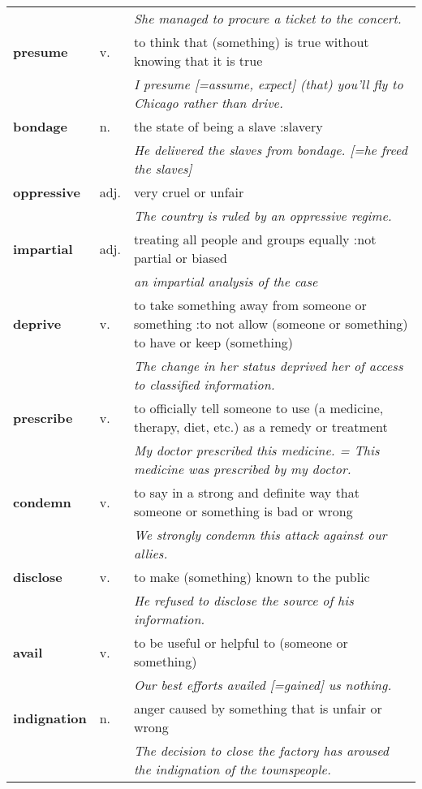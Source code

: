 \documentclass[a4paper]{article}
\begin{document}
\begin{longtable}{llp{11cm}}
 & & \textit{She managed to procure a ticket to the concert.}\\[0.08cm]
\textbf{presume} & v. &  to think that (something) is true without knowing that it is true \\
 & & \textit{I presume [=assume, expect] (that) you'll fly to Chicago rather than drive.}\\[0.08cm]
\textbf{bondage} & n. &  the state of being a slave :slavery \\
 & & \textit{He delivered the slaves from bondage. [=he freed the slaves]}\\[0.08cm]
\textbf{oppressive} & adj. &  very cruel or unfair \\
 & & \textit{The country is ruled by an oppressive regime.}\\[0.08cm]
\textbf{impartial} & adj. &  treating all people and groups equally :not partial or biased \\
 & & \textit{an impartial analysis of the case}\\[0.08cm]
\textbf{deprive} & v. &  to take something away from someone or something :to not allow (someone or something) to have or keep (something) \\
 & & \textit{The change in her status deprived her of access to classified information.}\\[0.08cm]
\textbf{prescribe} & v. &  to officially tell someone to use (a medicine, therapy, diet, etc.) as a remedy or treatment \\
 & & \textit{My doctor prescribed this medicine. = This medicine was prescribed by my doctor.}\\[0.08cm]
\textbf{condemn} & v. &  to say in a strong and definite way that someone or something is bad or wrong \\
 & & \textit{We strongly condemn this attack against our allies.}\\[0.08cm]
\textbf{disclose} & v. &  to make (something) known to the public \\
 & & \textit{He refused to disclose the source of his information.}\\[0.08cm]
\textbf{avail} & v. &  to be useful or helpful to (someone or something) \\
 & & \textit{Our best efforts availed [=gained] us nothing.}\\[0.08cm]
\textbf{indignation} & n. &  anger caused by something that is unfair or wrong \\
 & & \textit{The decision to close the factory has aroused the indignation of the townspeople.}\\[0.08cm]

\end{longtable}
\end{document}
